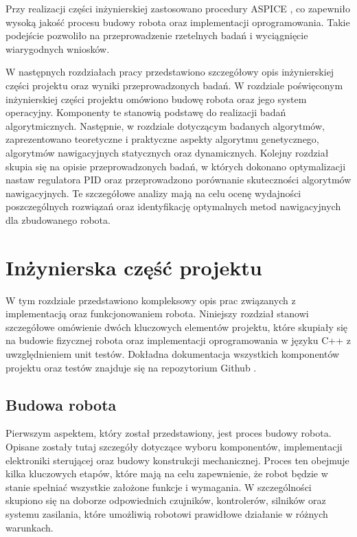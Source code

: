 \documentclass[12pt,twoside]{article}
\begin{document}
Przy realizacji części inżynierskiej zastosowano procedury ASPICE \cite{SPICE}, co  zapewniło wysoką jakość procesu budowy robota oraz implementacji oprogramowania. Takie podejście pozwoliło na przeprowadzenie rzetelnych badań i wyciągnięcie wiarygodnych wniosków.

W następnych rozdziałach pracy przedstawiono szczegółowy opis inżynierskiej części projektu oraz wyniki przeprowadzonych badań. W rozdziale poświęconym inżynierskiej części projektu omówiono budowę robota oraz jego system operacyjny. Komponenty te stanowią podstawę do realizacji badań algorytmicznych. Następnie, w rozdziale dotyczącym badanych algorytmów, zaprezentowano teoretyczne i praktyczne aspekty algorytmu genetycznego, algorytmów nawigacyjnych statycznych oraz dynamicznych. Kolejny rozdział skupia się na opisie przeprowadzonych badań, w których dokonano optymalizacji nastaw regulatora PID oraz przeprowadzono porównanie skuteczności algorytmów nawigacyjnych. Te szczegółowe analizy mają na celu ocenę wydajności poszczególnych rozwiązań oraz identyfikację optymalnych metod nawigacyjnych dla zbudowanego robota.

\section{Inżynierska część projektu}

W tym rozdziale przedstawiono kompleksowy opis prac związanych z implementacją oraz funkcjonowaniem robota. Niniejszy rozdział stanowi szczegółowe omówienie dwóch kluczowych elementów projektu, które skupiały się na budowie fizycznej robota oraz implementacji oprogramowania w języku C++ z uwzględnieniem unit testów.
Dokładna dokumentacja wszystkich komponentów projektu oraz testów znajduje się na repozytorium Github \cite{repo}.

\subsection{Budowa robota}

Pierwszym aspektem, który został przedstawiony, jest proces budowy robota. Opisane zostały tutaj szczegóły dotyczące wyboru komponentów, implementacji elektroniki sterującej oraz budowy konstrukcji mechanicznej. Proces ten obejmuje kilka kluczowych etapów, które mają na celu zapewnienie, że robot będzie w stanie spełniać wszystkie założone funkcje i wymagania. W szczególności skupiono się na doborze odpowiednich czujników, kontrolerów, silników oraz systemu zasilania, które umożliwią robotowi prawidłowe działanie w różnych warunkach.
\end{document}
